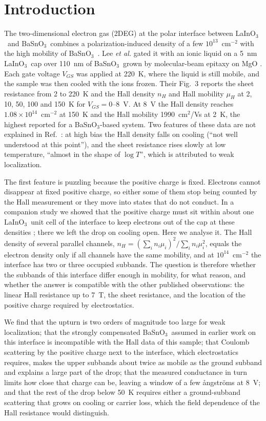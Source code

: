 \documentclass[11pt]{article}
\newcommand{\LIO}{\texorpdfstring{LaInO$_3$}{LaInO3}}
\newcommand{\BSO}{\texorpdfstring{BaSnO$_3$}{BaSnO3}}
\begin{document}
\section{Introduction}
The two-dimensional electron gas (2DEG) at the polar interface between \LIO\ and \BSO\ combines a polarization-induced density of a few $10^{13}$~cm$^{-2}$ with the high mobility of \BSO\ \cite{Kim2016LIO,Kim2019LIO,Aggoune2021}. Lee \emph{et al.} gated it with an ionic liquid on a 5~nm \LIO\ cap over 110~nm of \BSO\ grown by molecular-beam epitaxy on MgO \cite{Lee2024LIO}. Each gate voltage $V_{GS}$ was applied at 220~K, where the liquid is still mobile, and the sample was then cooled with the ions frozen. Their Fig.~3 reports the sheet resistance from 2 to 220~K and the Hall density $n_H$ and Hall mobility $\mu_H$ at 2, 10, 50, 100 and 150~K for $V_{GS}=0$--8~V. At 8~V the Hall density reaches $1.08\times10^{14}$~cm$^{-2}$ at 150~K and the Hall mobility 1990~cm$^2$/Vs at 2~K, the highest reported for a \BSO-based system. Two features of these data are not explained in Ref.~\cite{Lee2024LIO}: at high bias the Hall density falls on cooling (``not well understood at this point''), and the sheet resistance rises slowly at low temperature, ``almost in the shape of $\log T$'', which is attributed to weak localization.

The first feature is puzzling because the positive charge is fixed. Electrons cannot disappear at fixed positive charge, so either some of them stop being counted by the Hall measurement or they move into states that do not conduct. In a companion study we showed that the positive charge must sit within about one \LIO\ unit cell of the interface to keep electrons out of the cap at these densities \cite{OwnbyMAT02}; there we left the drop on cooling open. Here we analyse it. The Hall density of several parallel channels, $n_H=(\sum_in_i\mu_i)^2/\sum_in_i\mu_i^2$, equals the electron density only if all channels have the same mobility, and at $10^{14}$~cm$^{-2}$ the interface has two or three occupied subbands. The question is therefore whether the subbands of this interface differ enough in mobility, for what reason, and whether the answer is compatible with the other published observations: the linear Hall resistance up to 7~T, the sheet resistance, and the location of the positive charge required by electrostatics.

We find that the upturn is two orders of magnitude too large for weak localization; that the strongly compensated \BSO\ assumed in earlier work on this interface is incompatible with the Hall data of this sample; that Coulomb scattering by the positive charge next to the interface, which electrostatics requires, makes the upper subbands about twice as mobile as the ground subband and explains a large part of the drop; that the measured conductance in turn limits how close that charge can be, leaving a window of a few \aa ngstr\"oms at 8~V; and that the rest of the drop below 50~K requires either a ground-subband scattering that grows on cooling or carrier loss, which the field dependence of the Hall resistance would distinguish.
\end{document}
